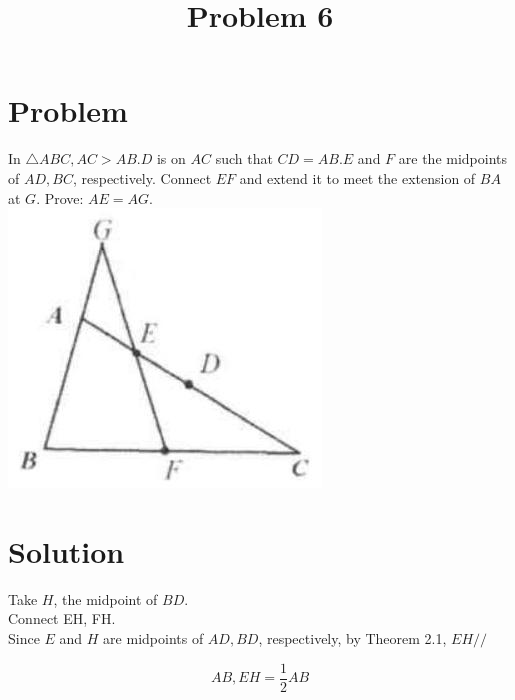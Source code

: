 \documentclass{article}
\title{Problem 6}
\date{}
\begin{document}
\maketitle

\section*{Problem}
In \(\triangle A B C, A C>A B . D\) is on \(A C\) such that \(C D=A B . E\) and \(F\) are the midpoints of \(A D, B C\), respectively. Connect \(E F\) and extend it to meet the extension of \(B A\) at \(G\). Prove: \(A E=A G\).\\
\centering
\includegraphics[width=\textwidth]{images/problem_image_1.jpg}

\section*{Solution}
Take \(H\), the midpoint of \(B D\).\\
Connect EH, FH.\\
Since \(E\) and \(H\) are midpoints of \(A D, B D\), respectively, by Theorem 2.1, \(E H / /\)

\[
A B, E H=\frac{1}{2} A B
\]
\end{document}
